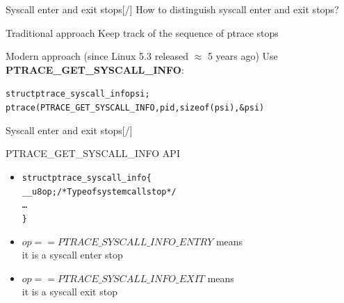 \documentclass[unicode,aspectratio=169,xcolor={table,dvipsnames,usenames}]{beamer}
\begin{document}
\begin{frame}[fragile]{\Large Syscall enter and exit stops\hfill [\insertframenumber/\inserttotalframenumber]}
\Large
How to distinguish syscall enter and exit stops?
\begin{block}{Traditional approach}
	Keep track of the sequence of ptrace stops
\end{block}

\begin{block}{Modern approach (since Linux 5.3 released $\approx$ 5 years ago)}
	Use \textbf{PTRACE\_GET\_SYSCALL\_INFO}:
	\begin{alltt}
		struct ptrace_syscall_info psi;
		ptrace(PTRACE_GET_SYSCALL_INFO, pid, sizeof(psi), &psi)
	\end{alltt}
\end{block}
\end{frame}

\begin{frame}[fragile]{\Large Syscall enter and exit stops\hfill [\insertframenumber/\inserttotalframenumber]}
\Large
\begin{block}{PTRACE\_GET\_SYSCALL\_INFO API}
\begin{itemize}
	\item \begin{alltt}
	struct ptrace_syscall_info \{
	  __u8 op;	\hfill /* Type of system call stop */
	  \ldots
	\}
	\end{alltt}
	\item $op == PTRACE\_SYSCALL\_INFO\_ENTRY$ means \\
		it is a syscall enter stop
	\item $op == PTRACE\_SYSCALL\_INFO\_EXIT$ means \\
		it is a syscall exit stop
\end{itemize}
\end{block}
\end{frame}
\end{document}
